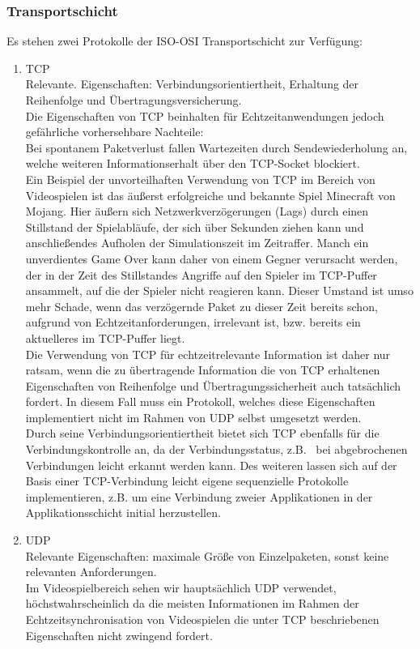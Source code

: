 \documentclass[11pt,twoside,a4paper]{article}
\begin{document}
\subsubsection{Transportschicht}
Es stehen zwei Protokolle der ISO-OSI Transportschicht zur Verfügung:
\begin{enumerate}
\item TCP\\
Relevante. Eigenschaften: Verbindungsorientiertheit, Erhaltung der Reihenfolge und Übertragungsversicherung.\\
	Die Eigenschaften von TCP beinhalten für Echtzeitanwendungen jedoch gefährliche vorhersehbare Nachteile:\\
	Bei spontanem Paketverlust fallen Wartezeiten durch Sendewiederholung an, welche weiteren Informationserhalt über den TCP-Socket blockiert.\\
Ein Beispiel der unvorteilhaften Verwendung von TCP im Bereich von Videospielen ist das äußerst erfolgreiche und bekannte Spiel Minecraft von Mojang. Hier äußern sich Netzwerkverzögerungen (Lags) durch einen Stillstand der Spielabläufe, der sich über Sekunden ziehen kann und anschließendes Aufholen der Simulationszeit im Zeitraffer. Manch ein unverdientes Game Over kann daher von einem Gegner verursacht werden, der in der Zeit des Stillstandes Angriffe auf den Spieler im TCP-Puffer ansammelt, auf die der Spieler nicht reagieren kann. Dieser Umstand ist umso mehr Schade, wenn das verzögernde Paket zu dieser Zeit bereits schon, aufgrund von Echtzeitanforderungen, irrelevant ist, bzw. bereits ein aktuelleres im TCP-Puffer liegt.\\
Die Verwendung von TCP für echtzeitrelevante Information ist daher nur ratsam, wenn die zu übertragende Information die von TCP erhaltenen Eigenschaften von Reihenfolge und Übertragungssicherheit auch tatsächlich fordert. In diesem Fall muss ein Protokoll, welches diese Eigenschaften implementiert nicht im Rahmen von UDP selbst umgesetzt werden.\\
Durch seine Verbindungsorientiertheit bietet sich TCP ebenfalls für die Verbindungskontrolle an, da der Verbindungsstatus, z.B.~ bei abgebrochenen Verbindungen leicht erkannt werden kann. Des weiteren lassen sich auf der Basis einer TCP-Verbindung leicht eigene sequenzielle Protokolle implementieren, z.B. um eine Verbindung zweier Applikationen in der Applikationsschicht initial herzustellen.
\item UDP\\
Relevante Eigenschaften: maximale Größe von Einzelpaketen, sonst keine relevanten Anforderungen.\\
	Im Videospielbereich sehen wir hauptsächlich UDP verwendet, höchstwahrscheinlich da die meisten Informationen im Rahmen der Echtzeitsynchronisation von Videospielen die unter TCP beschriebenen Eigenschaften nicht zwingend fordert.
\end{enumerate}
\end{document}
